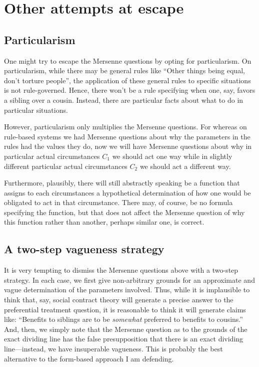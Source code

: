 \section{Other attempts at escape}
\subsection{Particularism}
One might try to escape the Mersenne questions by opting for particularism. On particularism, while there may be general rules
like ``Other things being equal, don't torture people'', the application of these general rules to specific situations is not
rule-governed. Hence, there won't be a rule specifying when one, say, favors a sibling over a cousin. Instead, there are 
particular facts about what to do in particular situations. 

However, particularism only multiplies the Mersenne questions. For whereas on rule-based systems we had Mersenne questions
about why the parameters in the rules had the values they do, now we will have Mersenne questions about why in particular actual
circumstances $C_1$ we should act one way while in slightly different particular actual circumstances $C_2$ we should act a
different way.

Furthermore, plausibly, there will still abstractly speaking be a function that assigns to each circumstances a hypothetical determination
of how one would be obligated to act in that circumstance. There may, of course, be no formula specifying the function, but that does not
affect the Mersenne question of why this function rather than another, perhaps similar one, is correct.

\subsection{A two-step vagueness strategy}
It is very tempting to dismiss the Mersenne questions above with a two-step strategy. In each case, we first give non-arbitrary grounds for 
an approximate and vague determination of the parameters involved. Thus, while it is implausible to think that, say, social contract theory
will generate a precise answer to the preferential treatment question, it is reasonable to think it will generate claims like: ``Benefits to 
siblings are to be \textit{somewhat} preferred to benefits to cousins.'' And, then, we simply note that the Mersenne question as to the grounds
of the exact dividing line has the false presupposition that there is an exact dividing line---instead, we have insuperable vagueness.
This is probably the best alternative to the form-based approach I am defending.

